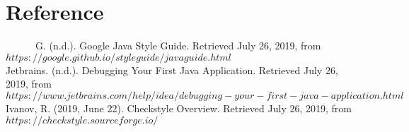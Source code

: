 \documentclass{article}
\begin{document}
\section{Reference}


 \ \ \ \ \ \ G. (n.d.). Google Java Style Guide. Retrieved July 26, 2019, from \\ $ https://google.github.io/styleguide/javaguide.html $ \\

Jetbrains. (n.d.). Debugging Your First Java Application. Retrieved July 26, 2019, from \\ $ https://www.jetbrains.com/help/idea/debugging-your-first-java-application.html  $ \\

Ivanov, R. (2019, June 22). Checkstyle Overview. Retrieved July 26, 2019, from \\ $ https://checkstyle.sourceforge.io/  $
\end{document}
